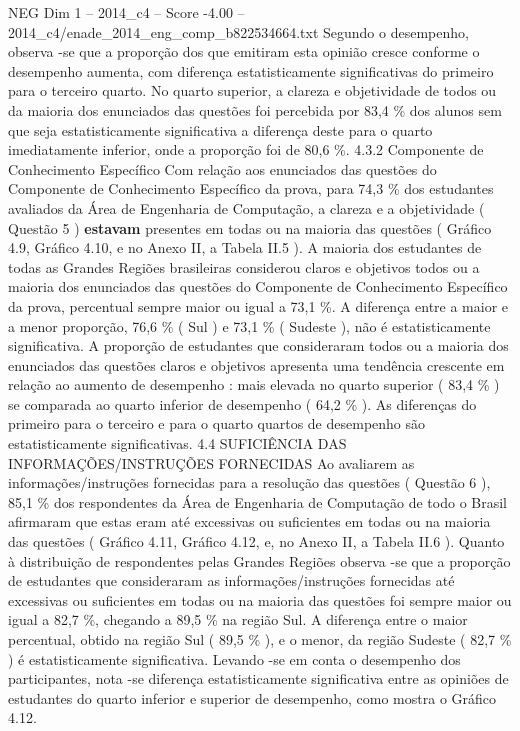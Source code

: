 \begin{textsample}{NEG Dim 1 – 2014\_c4 – Score -4.00 – 2014\_c4/enade\_2014\_eng\_comp\_b822534664.txt}
Segundo o desempenho, observa -se que a proporção dos que emitiram esta opinião cresce conforme o desempenho aumenta, com diferença estatisticamente significativas do primeiro para o terceiro quarto.
No quarto superior, a clareza e objetividade de todos ou da maioria dos enunciados das questões foi percebida por 83,4 \% dos alunos sem que seja estatisticamente significativa a diferença deste para o quarto imediatamente inferior, onde a proporção foi de 80,6 \%. 4.3.2 Componente de Conhecimento Específico Com relação aos enunciados das questões do Componente de Conhecimento Específico da prova, para 74,3 \% dos estudantes avaliados da Área de Engenharia de Computação, a clareza e a objetividade ( Questão 5 ) \textbf{estavam} presentes em todas ou na maioria das questões ( Gráfico 4.9, Gráfico 4.10, e no Anexo II, a Tabela II.5 ).
A maioria dos estudantes de todas as Grandes Regiões brasileiras considerou claros e objetivos todos ou a maioria dos enunciados das questões do Componente de Conhecimento Específico da prova, percentual sempre maior ou igual a 73,1 \%.
A diferença entre a maior e a menor proporção, 76,6 \% ( Sul ) e 73,1 \% ( Sudeste ), não é estatisticamente significativa.
A proporção de estudantes que consideraram todos ou a maioria dos enunciados das questões claros e objetivos apresenta uma tendência crescente em relação ao aumento de desempenho : mais elevada no quarto superior ( 83,4 \% ) se comparada ao quarto inferior de desempenho ( 64,2 \% ).
As diferenças do primeiro para o terceiro e para o quarto quartos de desempenho são estatisticamente significativas. 4.4 SUFICIÊNCIA DAS INFORMAÇÕES/INSTRUÇÕES FORNECIDAS Ao avaliarem as informações/instruções fornecidas para a resolução das questões ( Questão 6 ), 85,1 \% dos respondentes da Área de Engenharia de Computação de todo o Brasil afirmaram que estas eram até excessivas ou suficientes em todas ou na maioria das questões ( Gráfico 4.11, Gráfico 4.12, e, no Anexo II, a Tabela II.6 ).
Quanto à distribuição de respondentes pelas Grandes Regiões observa -se que a proporção de estudantes que consideraram as informações/instruções fornecidas até excessivas ou suficientes em todas ou na maioria das questões foi sempre maior ou igual a 82,7 \%, chegando a 89,5 \% na região Sul.
A diferença entre o maior percentual, obtido na região Sul ( 89,5 \% ), e o menor, da região Sudeste ( 82,7 \% ) é estatisticamente significativa.
Levando -se em conta o desempenho dos participantes, nota -se diferença estatisticamente significativa entre as opiniões de estudantes do quarto inferior e superior de desempenho, como mostra o Gráfico 4.12.

\end{textsample}
